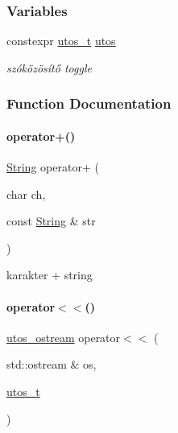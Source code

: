 \subsubsection*{Variables}
\begin{DoxyCompactItemize}
\item 
constexpr \mbox{\hyperlink{structutos__t}{utos\+\_\+t}} \mbox{\hyperlink{schtring_8hpp_a87ab25645bb130a0e89654a4ba9d2bce}{utos}}
\begin{DoxyCompactList}\small\item\em szóközösítő toggle \end{DoxyCompactList}\end{DoxyCompactItemize}


\subsubsection{Function Documentation}
\mbox{\label{schtring_8hpp_a8d89d501f582c3a65df894dbd030bbcf}} 
\paragraph{\texorpdfstring{operator+()}{operator+()}}
{\footnotesize\ttfamily \mbox{\hyperlink{class_string}{String}} operator+ (\begin{DoxyParamCaption}\item[{char}]{ch,  }\item[{const \mbox{\hyperlink{class_string}{String}} \&}]{str }\end{DoxyParamCaption})\hspace{0.3cm}{\ttfamily [inline]}}



karakter + string 

\mbox{\label{schtring_8hpp_a43aac73473ffa53d46bd5f53f0570e3e}} 
\paragraph{\texorpdfstring{operator$<$$<$()}{operator<<()}\hspace{0.1cm}{\footnotesize\ttfamily [1/4]}}
{\footnotesize\ttfamily \mbox{\hyperlink{structutos__ostream}{utos\+\_\+ostream}} operator$<$$<$ (\begin{DoxyParamCaption}\item[{std\+::ostream \&}]{os,  }\item[{\mbox{\hyperlink{structutos__t}{utos\+\_\+t}}}]{ }\end{DoxyParamCaption})\hspace{0.3cm}{\ttfamily [inline]}}



